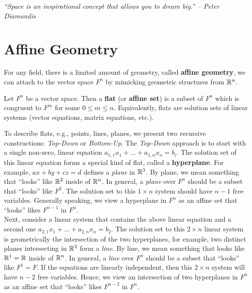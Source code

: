 \begin{center} 
\emph{``Space is an inspirational concept that allows you to dream big.'' -- Peter Diamandis}
\end{center}

\section{Affine Geometry}\label{sec:flat}
For any field, there is a limited amount of geometry, called \textbf{affine geometry}, we can attach to the vector space $F^n$ by mimicking geometric structures from $\mathbb{R}^n$.\\

\begin{Def} Let $F^n$ be a vector space. Then a \textbf{flat} (or \textbf{affine set}) is a subset of $F^n$ which is congruent to $F^m$ for some $0\le m\le n$. Equivalently, flats are solution sets of linear systems (vector equations, matrix equations, etc.).
\end{Def}\vs

To describe flats, e.g., points, lines, planes, we present two recursive constructions: \emph{Top-Down} or \emph{Bottom-Up}. The \emph{Top-Down} approach is to start with a single non-zero, linear equation $a_{1,1}x_1+\ldots + a_{1,n}x_n=b_i$. The solution set of this linear equation forms a special kind of flat, called  a \textbf{hyperplane}. For example, $ax+by+cz=d$ defines a \emph{plane} in $\mathbb{R}^3$. By plane, we mean something that ``looks'' like $\mathbb{R}^2$ inside of $\mathbb{R}^n$. In general, a \emph{plane} over $F^n$ should be a subset that ``looks'' like $F^2$. The solution set to this $1\times n$ system should have $n-1$ free variables. Generally speaking, we view a hyperplane in $F^n$ as an affine set that ``looks'' likes $F^{n-1}$ in $F^n$. \\

Next, consider a linear system that contains the above linear equation and a second one $a_{2,1}x_1 + \ldots + a_{2,n}x_n=b_2$. The solution set to this $2\times n$ linear system is geometrically the intersection of the two hyperplanes, for example, two distinct planes intersecting in $\mathbb{R}^3$ form a \emph{line}. By line, we mean something that looks like $\mathbb{R}^1=\mathbb{R}$ inside of $\mathbb{R}^n$. In general, a \emph{line} over $F^n$ should be a subset that ``looks'' like $F^1=F$. If the equations are linearly independent, then this $2\times n$ system will have $n-2$ free variables. Hence, we view an intersection of two hyperplanes in $F^n$ as an affine set that ``looks'' likes $F^{n-2}$ in $F^n$. \\

